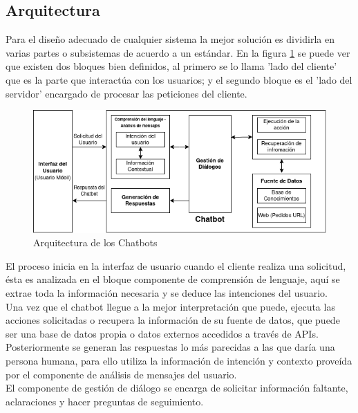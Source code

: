 \subsection{Arquitectura}
Para el diseño adecuado de cualquier sistema la mejor solución es dividirla en varias partes o
subsistemas de acuerdo a un estándar.
En la figura \ref{fig:Arquitectura} se puede ver que existen dos bloques bien definidos, al primero
se lo llama 'lado del cliente' que es la parte que interactúa con los usuarios; y el segundo bloque
es el 'lado del servidor' encargado de procesar las peticiones del cliente.\\
\begin{figure}[h]
	\centering
	\includegraphics[width=\textwidth]{imagenes/Cap 2/Arquitectura.png}
	\caption{Arquitectura de los Chatbots}
	\label{fig:Arquitectura}
\end{figure}
\indent El  proceso inicia en la interfaz de usuario cuando el cliente realiza una solicitud, ésta
es analizada en el bloque componente de comprensión de lenguaje, aquí se extrae toda la información
necesaria y se deduce las intenciones del usuario.\\
\indent Una vez que el chatbot llegue a la mejor interpretación que puede, ejecuta las acciones
solicitadas o recupera la información de su fuente de datos, que puede ser una base de datos propia
o datos externos accedidos a través de APIs.\\
\indent Posteriormente se generan las respuestas lo más parecidas a las que daría una persona
humana, para ello utiliza la información de intención y contexto proveída por el componente de
análisis de mensajes del usuario.\\
\indent El componente de gestión de diálogo se encarga de solicitar información faltante,
aclaraciones y hacer preguntas de seguimiento.\cite{Overview_of_chatbots}

